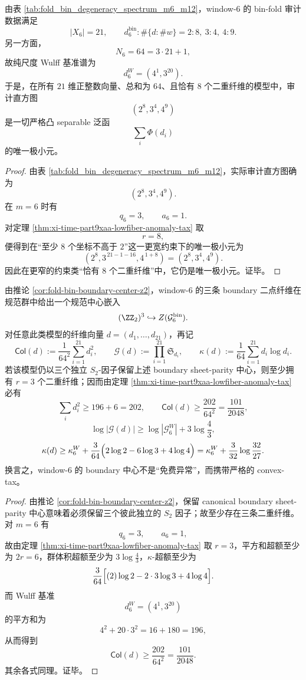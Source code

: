 \begin{theorem}\label{thm:xi-time-part9xaa-window6-audit-histogram-variational-characterization}
由表 \ref{tab:fold_bin_degeneracy_spectrum_m6_m12}，window-\(6\) 的 bin-fold 审计数据满足
\[
|X_6|=21,
\qquad
d_6^{\mathrm{bin}}:\#\{d:\#w\}=2:8,\ 3:4,\ 4:9.
\]
另一方面，
\[
N_6=64=3\cdot 21+1,
\]
故纯尺度 Wulff 基准谱为
\[
d_6^{W}=(4^1,3^{20}).
\]
于是，在所有 \(21\) 维正整数向量、总和为 \(64\)、且恰有 \(8\) 个二重纤维的模型中，审计直方图
\[
(2^8,3^4,4^9)
\]
是一切严格凸 separable 泛函
\[
\sum_i \Phi(d_i)
\]
的唯一极小元。
\end{theorem}
\begin{proof}
由表 \ref{tab:fold_bin_degeneracy_spectrum_m6_m12}，实际审计直方图确为
\[
(2^8,3^4,4^9).
\]
在 \(m=6\) 时有
\[
q_6=3,\qquad a_6=1.
\]
对定理 \ref{thm:xi-time-part9xaa-lowfiber-anomaly-tax} 取
\[
r=8,
\]
便得到在“至少 \(8\) 个坐标不高于 \(2\)”这一更宽约束下的唯一极小元为
\[
(2^8,3^{\,21-1-16},4^{\,1+8})=(2^8,3^4,4^9).
\]
因此在更窄的约束类“恰有 \(8\) 个二重纤维”中，它仍是唯一极小元。证毕。
\end{proof}

\begin{corollary}\label{cor:xi-time-part9xaa-boundary-center-irreducible-tax}
由推论 \ref{cor:fold-bin-boundary-center-z2}，window-\(6\) 的三条 boundary 二点纤维在规范群中给出一个规范中心嵌入
\[
(\ZZ_2)^3\hookrightarrow Z(\mathcal G_6^{\mathrm{bin}}).
\]
对任意此类模型的纤维向量 \(d=(d_1,\dots,d_{21})\)，再记
\[
\mathsf{Col}(d):=\frac1{64^2}\sum_{i=1}^{21}d_i^2,
\qquad
\mathcal G(d):=\prod_{i=1}^{21}\mathfrak S_{d_i},
\qquad
\kappa(d):=\frac1{64}\sum_{i=1}^{21}d_i\log d_i.
\]
若该模型仍以三个独立 \(S_2\)-因子保留上述 boundary sheet-parity 中心，则至少拥有 \(r=3\) 个二重纤维；因而由定理 \ref{thm:xi-time-part9xaa-lowfiber-anomaly-tax} 必有
\[
\sum_i d_i^2\ge 196+6=202,
\qquad
\mathsf{Col}(d)\ge \frac{202}{64^2}=\frac{101}{2048},
\]
\[
\log|\mathcal G(d)|\ge \log|\mathcal G_6^{W}|+3\log\frac43,
\]
\[
\kappa(d)\ge \kappa_6^{W}
+
\frac{3}{64}\Bigl(2\log2-6\log3+4\log4\Bigr)
=
\kappa_6^{W}+\frac{3}{32}\log\frac{32}{27}.
\]
换言之，window-\(6\) 的 boundary 中心不是“免费异常”，而携带严格的 convex-tax。
\end{corollary}
\begin{proof}
由推论 \ref{cor:fold-bin-boundary-center-z2}，保留 canonical boundary sheet-parity 中心意味着必须保留三个彼此独立的 \(S_2\) 因子；故至少存在三条二重纤维。对 \(m=6\) 有
\[
q_6=3,\qquad a_6=1,
\]
故由定理 \ref{thm:xi-time-part9xaa-lowfiber-anomaly-tax} 取 \(r=3\)，平方和超额至少为 \(2r=6\)，群体积超额至少为 \(3\log\frac43\)，\(\kappa\)-超额至少为
\[
\frac{3}{64}\Bigl[(2)\log2-2\cdot 3\log3+4\log4\Bigr].
\]
而 Wulff 基准
\[
d_6^{W}=(4^1,3^{20})
\]
的平方和为
\[
4^2+20\cdot 3^2=16+180=196,
\]
从而得到
\[
\mathsf{Col}(d)\ge \frac{202}{64^2}=\frac{101}{2048}.
\]
其余各式同理。证毕。
\end{proof}
\endinput
